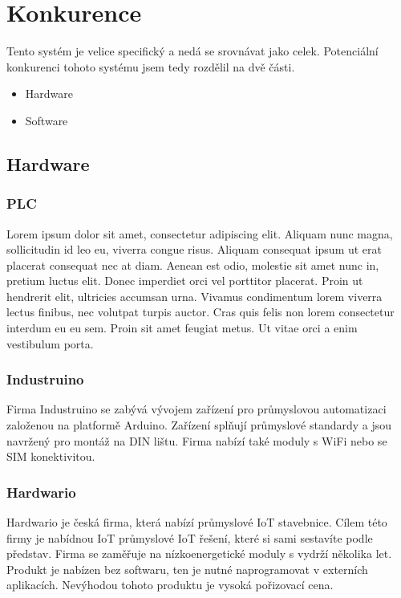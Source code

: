 \chapter{Konkurence}
Tento systém je velice specifický a nedá se srovnávat jako celek. 
Potenciální konkurenci tohoto systému jsem tedy rozdělil na dvě části.

\begin{itemize} %
    \item Hardware
    \item Software
\end{itemize}



\section{Hardware}




\subsection{PLC}
Lorem ipsum dolor sit amet, consectetur adipiscing elit.
Aliquam nunc magna, sollicitudin id leo eu, viverra congue risus.
Aliquam consequat ipsum ut erat placerat consequat nec at diam. 
Aenean est odio, molestie sit amet nunc in, pretium luctus elit. 
Donec imperdiet orci vel porttitor placerat. 
Proin ut hendrerit elit, ultricies accumsan urna. 
Vivamus condimentum lorem viverra lectus finibus, nec volutpat turpis auctor.
Cras quis felis non lorem consectetur interdum eu eu sem. 
Proin sit amet feugiat metus. 
Ut vitae orci a enim vestibulum porta. 


\subsection{Industruino}
Firma Industruino\cite{INDUSTRINO} se zabývá vývojem zařízení pro průmyslovou automatizaci založenou na platformě Arduino.
Zařízení splňují průmyslové standardy a jsou navržený pro montáž na  DIN lištu. Firma nabízí také moduly s WiFi nebo se SIM konektivitou.


\subsection{Hardwario}

Hardwario\cite{HARDWARIO} je česká firma, která nabízí průmyslové IoT stavebnice.
Cílem této firmy je nabídnou IoT průmyslové IoT řešení, které si sami sestavíte podle představ.
Firma se zaměřuje na nízkoenergetické moduly s vydrží několika let.
Produkt je nabízen bez softwaru, ten je nutné naprogramovat v externích aplikacích.
Nevýhodou tohoto produktu je vysoká pořizovací cena.





